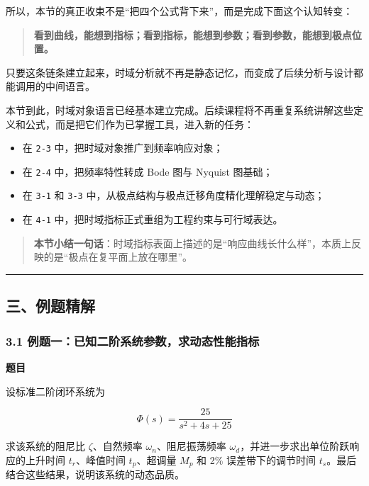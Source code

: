 \documentclass[
  11pt]{article}
\providecommand{\tightlist}{%
  \setlength{\itemsep}{0pt}\setlength{\parskip}{0pt}}
\begin{document}
所以，本节的真正收束不是``把四个公式背下来''，而是完成下面这个认知转变：

\begin{quote}
\textbf{看到曲线，能想到指标；看到指标，能想到参数；看到参数，能想到极点位置。}
\end{quote}

只要这条链条建立起来，时域分析就不再是静态记忆，而变成了后续分析与设计都能调用的中间语言。

本节到此，时域对象语言已经基本建立完成。后续课程将不再重复系统讲解这些定义和公式，而是把它们作为已掌握工具，进入新的任务：

\begin{itemize}
\tightlist
\item
  在 \texttt{2-3} 中，把时域对象推广到频率响应对象；
\item
  在 \texttt{2-4} 中，把频率特性转成 Bode 图与 Nyquist 图基础；
\item
  在 \texttt{3-1} 和 \texttt{3-3}
  中，从极点结构与极点迁移角度精化理解稳定与动态；
\item
  在 \texttt{4-1} 中，把时域指标正式重组为工程约束与可行域表达。
\end{itemize}

\begin{quote}
\textbf{本节小结一句话}：时域指标表面上描述的是``响应曲线长什么样''，本质上反映的是``极点在复平面上放在哪里''。
\end{quote}

\begin{center}\rule{0.5\linewidth}{0.5pt}\end{center}

\subsection{三、例题精解}\label{ux4e09ux4f8bux9898ux7cbeux89e3}

\subsubsection{3.1
例题一：已知二阶系统参数，求动态性能指标}\label{ux4f8bux9898ux4e00ux5df2ux77e5ux4e8cux9636ux7cfbux7edfux53c2ux6570ux6c42ux52a8ux6001ux6027ux80fdux6307ux6807}

\textbf{题目}

设标准二阶闭环系统为

\[
\Phi(s) = \frac{25}{s^2 + 4s + 25}
\]

求该系统的阻尼比 \(\zeta\)、自然频率 \(\omega_n\)、阻尼振荡频率
\(\omega_d\)，并进一步求出单位阶跃响应的上升时间 \(t_r\)、峰值时间
\(t_p\)、超调量 \(M_p\) 和 2\% 误差带下的调节时间
\(t_s\)。最后结合这些结果，说明该系统的动态品质。
\end{document}

